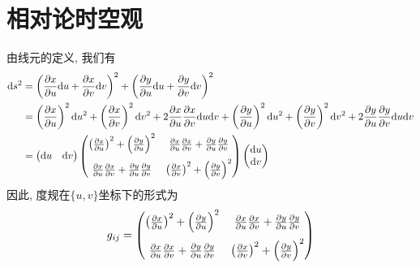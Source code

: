 \chapter{相对论时空观}
\begin{solution}
    由线元的定义, 我们有
    \begin{align*}
        \dd s^2 &= \left(\frac{\partial x}{\partial u} \dd u + \frac{\partial x}{\partial v} \dd v\right)^2 + \left(\frac{\partial y}{\partial u} \dd u + \frac{\partial y}{\partial v} \dd v\right)^2 \\
        &= \left(\frac{\partial x}{\partial u}\right)^2 \dd u^2 + \left(\frac{\partial x}{\partial v}\right)^2 \dd v^2 + 2\frac{\partial x}{\partial u} \frac{\partial x}{\partial v} \dd u \dd v + \left(\frac{\partial y}{\partial u}\right)^2 \dd u^2 + \left(\frac{\partial y}{\partial v}\right)^2 \dd v^2 + 2\frac{\partial y}{\partial u} \frac{\partial y}{\partial v} \dd u \dd v \\
        &= \begin{pmatrix}
            \dd u & \dd v
        \end{pmatrix} \begin{pmatrix}
            \left(\frac{\partial x}{\partial u}\right)^2+\left(\frac{\partial y}{\partial u}\right)^2 & \frac{\partial x}{\partial u} \frac{\partial x}{\partial v}+\frac{\partial y}{\partial u} \frac{\partial y}{\partial v} \\[0.8em]
            \frac{\partial x}{\partial u} \frac{\partial x}{\partial v}+\frac{\partial y}{\partial u} \frac{\partial y}{\partial v} & \left(\frac{\partial x}{\partial v}\right)^2+\left(\frac{\partial y}{\partial v}\right)^2
        \end{pmatrix} \begin{pmatrix}
            \dd u \\ \dd v
        \end{pmatrix}
    \end{align*}
    因此, 度规在$\{u,v\}$坐标下的形式为
    \[
        g_{ij} = \begin{pmatrix}
        	\left(\frac{\partial x}{\partial u}\right)^2+\left(\frac{\partial y}{\partial u}\right)^2 & \frac{\partial x}{\partial u} \frac{\partial x}{\partial v}+\frac{\partial y}{\partial u} \frac{\partial y}{\partial v} \\[0.8em]
        	\frac{\partial x}{\partial u} \frac{\partial x}{\partial v}+\frac{\partial y}{\partial u} \frac{\partial y}{\partial v} & \left(\frac{\partial x}{\partial v}\right)^2+\left(\frac{\partial y}{\partial v}\right)^2
        \end{pmatrix} 
    \]
\end{solution}


